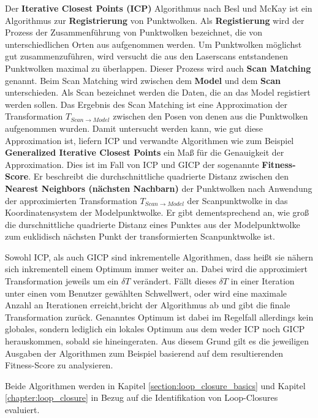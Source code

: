 Der \textbf{Iterative Closest Points (ICP)} Algorithmus nach Besl und McKay \cite{Besl:1992} ist ein Algorithmus zur \textbf{Registrierung} von Punktwolken.
Als \textbf{Registierung} wird der Prozess der Zusammenführung von Punktwolken bezeichnet, die von unterschiedlichen Orten aus aufgenommen werden. Um Punktwolken möglichst gut zusammenzuführen, wird versucht die aus den Laserscans entstandenen Punktwolken maximal zu überlappen. Dieser Prozess wird auch \textbf{Scan Matching} genannt.
Beim Scan Matching wird zwischen dem \textbf{Model} und dem \textbf{Scan} unterschieden.
Als Scan bezeichnet werden die Daten, die an das Model registiert werden sollen.
Das Ergebnis des Scan Matching ist eine Approximation der Transformation $T_{Scan \rightarrow Model}$ zwischen den Posen von denen aus die Punktwolken aufgenommen wurden.
Damit untersucht werden kann, wie gut diese Approximation ist, liefern ICP und verwandte Algorithmen wie zum Beispiel \textbf{Generalized Iterative Closest Points} \cite{segal2009generalized} ein Maß für die Genauigkeit der Approximation. Dies ist im Fall von ICP und GICP der sogenannte \textbf{Fitness-Score}. Er beschreibt die durchschnittliche quadrierte Distanz zwischen den \textbf{Nearest Neighbors (nächsten Nachbarn)} der Punktwolken nach Anwendung der approximierten Transformation $T_{Scan \rightarrow Model}$ der Scanpunktwolke in das Koordinatensystem der Modelpunktwolke.
Er gibt dementsprechend an, wie groß die durschnittliche quadrierte Distanz eines Punktes aus der Modelpunktwolke zum euklidisch nächsten Punkt der transformierten Scanpunktwolke ist.

Sowohl ICP, als auch GICP sind inkrementelle Algorithmen, dass heißt sie nähern sich inkrementell einem Optimum immer weiter an. Dabei wird die approximiert Transformation jeweils um ein $\delta T$ verändert. Fällt dieses $\delta T$ in einer Iteration unter einen vom Benutzer gewählten Schwellwert, oder wird eine maximale Anzahl an Iterationen erreicht,bricht der Algorithmus ab und gibt die finale Transformation zurück.
Genanntes Optimum ist dabei im Regelfall allerdings kein globales, sondern lediglich ein lokales Optimum aus dem weder ICP noch GICP herauskommen, sobald sie hineingeraten.
Aus diesem Grund gilt es die jeweiligen Ausgaben der Algorithmen zum Beispiel basierend auf dem resultierenden Fitness-Score zu analysieren. 

Beide Algorithmen werden in Kapitel \ref{section:loop_closure_basics} und Kapitel \ref{chapter:loop_closure} in Bezug auf die Identifikation von Loop-Closures evaluiert.

